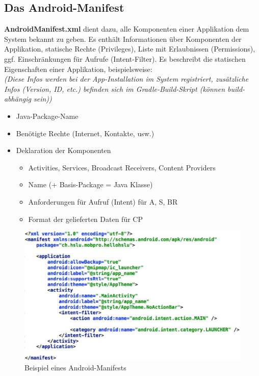 \documentclass[a4paper]{article}
\begin{document}
\subsection{Das Android-Manifest}
\textbf{AndroidManifest.xml} dient dazu, alle Komponenten einer Applikation dem System bekannt zu geben. Es enthält Informationen über Komponenten der Applikation, statische Rechte (Privileges), Liste mit Erlaubnissen (Permissions), ggf. Einschränkungen für Aufrufe (Intent-Filter). Es beschreibt die statischen Eigenschaften einer Applikation, beispielsweise: \\
\textit{(Diese Infos werden bei der App-Installation im System registriert, zusätzliche Infos (Version, ID, etc.) befinden sich im Gradle-Build-Skript (können build-abhängig sein))}

\begin{itemize}
	\item Java-Package-Name
	\item Benötigte Rechte (Internet, Kontakte, usw.)
	\item Deklaration der Komponenten
	\begin{itemize}
		\item Activities, Services, Broadcast Receivers, Content Providers
		\item Name (+ Basis-Package = Java Klasse)
		\item Anforderungen für Aufruf (Intent) für A, S, BR
		\item Format der gelieferten Daten für CP
	\end{itemize}
\end{itemize}
\begin{figure}[htb!]
	\centering
	\includegraphics[width=12cm]{img/manifestxml.jpg}
	\caption{Beispiel eines Android-Manifests}
	\label{fig:manifestxml}
\end{figure}
\end{document}
